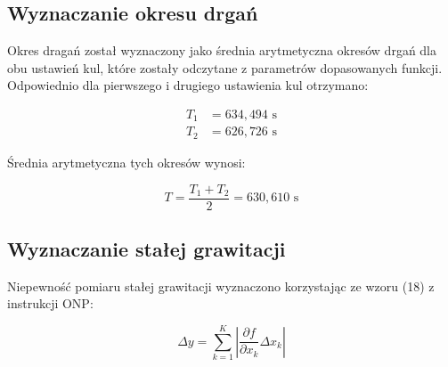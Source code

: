 \documentclass[a4paper,12pt]{article}
\begin{document}


\subsection{Wyznaczanie okresu drgań}

Okres dragań został wyznaczony jako średnia arytmetyczna okresów drgań dla obu ustawień kul, które zostały odczytane z parametrów dopasowanych funkcji. Odpowiednio dla pierwszego i drugiego ustawienia kul otrzymano:

\begin{align*}
    T_1 & = 634{,}494 \text{ s} \\
    T_2 & = 626{,}726 \text{ s}
\end{align*}

Średnia arytmetyczna tych okresów wynosi:

$$
    T = \frac{T_1 + T_2}{2} = 630{,}610 \text{ s}
$$





\subsection{Wyznaczanie stałej grawitacji}

Niepewność pomiaru stałej grawitacji wyznaczono korzystając ze wzoru (18) z instrukcji ONP:

\begin{equation*}
    \Delta y = \sum_{k=1}^{K} \left| \frac{\partial f}{\partial x_k} \Delta x_k \right|
\end{equation*}
\end{document}
